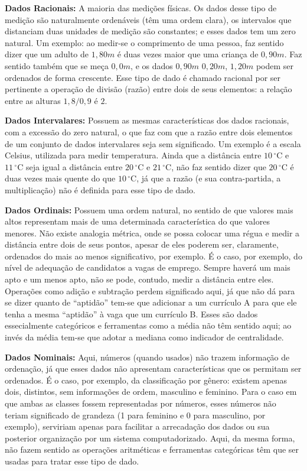 \begin{description}
	\item{\textbf{Dados Racionais:}} A maioria das medições físicas. Os dados desse tipo de medição são naturalmente ordenáveis (têm uma ordem clara), os intervalos que distanciam duas unidades de medição são constantes; e esses dados tem um zero natural. Um exemplo: ao medir-se o comprimento de uma pessoa, faz sentido dizer que um adulto de $1,80m$ é duas vezes maior que uma criança de $0,90m$. Faz sentido também que se meça $0,0m$, e os dados $0,90m$ $0,20m$, $1,20m$ podem ser ordenados de forma crescente. Esse tipo de dado é chamado racional por ser pertinente a operação de divisão (razão) entre dois de seus elementos: a relação entre as alturas $1,8/0,9$ é $2$.
	\item{\textbf{Dados Intervalares:}} Possuem as mesmas características dos dados racionais, com a excessão do zero natural, o que faz com que a razão entre dois elementos de um conjunto de dados intervalares seja sem significado. Um exemplo é a escala Celsius, utilizada para medir temperatura. Ainda que a distância entre $10\,^{\circ}\mathrm{C}$ e $11\,^{\circ}\mathrm{C}$ seja igual a distância entre $20\,^{\circ}\mathrm{C}$ e $21\,^{\circ}\mathrm{C}$, não faz sentido dizer que $20\,^{\circ}\mathrm{C}$ é duas vezes mais quente do que $10\,^{\circ}\mathrm{C}$, já que a razão (e sua contra-partida, a multiplicação) não é definida para esse tipo de dado.
	\item{\textbf{Dados Ordinais:}} Possuem uma ordem natural, no sentido de que valores mais altos representam mais de uma determinada característica do que valores menores. Não existe analogia métrica, onde se possa colocar uma régua e medir a distância entre dois de seus pontos, apesar de eles poderem ser, claramente, ordenados do mais ao menos significativo, por exemplo. É o caso, por exemplo, do nível de adequação de candidatos a vagas de emprego. Sempre haverá um mais apto e um menos apto, não se pode, contudo, medir a distância entre eles. Operações como adição e subtração perdem significado aqui, já que não dá para se dizer quanto de ``aptidão'' tem-se que adicionar a um currículo A para que ele tenha a mesma ``aptidão'' à vaga que um currículo B. Esses são dados essecialmente categóricos e ferramentas como a média não têm sentido aqui; ao invés da média tem-se que adotar a mediana como indicador de centralidade.
	\item{\textbf{Dados Nominais:}} Aqui, números (quando usados) não trazem informação de ordenação, já que esses dados não apresentam características que os permitam ser ordenados. É o caso, por exemplo, da classificação por gênero: existem apenas dois, distintos, sem informações de ordem, masculino e feminino. Para o caso em que ambas as classes fossem representadas por números, esses números não teriam significado de grandeza (1 para feminino e 0 para masculino, por exemplo), serviriam apenas para facilitar a arrecadação dos dados ou sua posterior organização por um sistema computadorizado. Aqui, da mesma forma, não fazem sentido as operações aritméticas e ferramentas categóricas têm que ser usadas para tratar esse tipo de dado.
\end{description}

